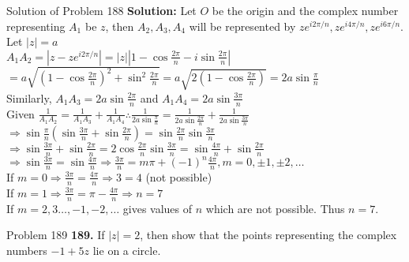 \documentclass[aspectratio=169,8pt]{beamer}
\begin{document}
\begin{frame}{Solution of Problem 188}
  \textbf{Solution:} Let $O$ be the origin and the complex number representing $A_1$ be $z$, then $A_2, A_3, A_4$ will be
  represented by $ze^{i2\pi/n}, ze^{i4\pi/n}, ze^{i6\pi/n}$. Let $|z| = a$\\
  \vspace*{0.2cm}
  $A_1A_2 = \left|z - ze^{i2\pi/n}\right| = |z|\left|1 - \cos\frac{2\pi}{n} - i\sin\frac{2\pi}{n}\right|$\\
  \vspace*{0.2cm}
  $= a\sqrt{\left(1 - \cos\frac{2\pi}{n}\right)^2 + \sin^2\frac{2\pi}{n}} = a\sqrt{2\left(1 - \cos\frac{2\pi}{n}\right)} =
  2a\sin\frac{\pi}{n}$\\
  \vspace*{0.2cm}
  Similarly, $A_1A_3 = 2a\sin\frac{2\pi}{n}$ and $A_1A_4 = 2a\sin\frac{3\pi}{n}$\\
  \vspace*{0.2cm}
  Given $\frac{1}{A_1A_2} = \frac{1}{A_1A_3} + \frac{1}{A_1A_4}\therefore \frac{1}{2a\sin\frac{\pi}{n}} =
  \frac{1}{2a\sin\frac{2\pi}{n}} + \frac{1}{2a\sin\frac{3\pi}{n}}$\\
  \vspace*{0.2cm}
  $\Rightarrow \sin\frac{\pi}{n}\left(\sin\frac{3\pi}{n} + \sin\frac{2\pi}{n}\right) = \sin\frac{2\pi}{n}\sin\frac{3\pi}{n}$\\
  \vspace*{0.2cm}
  $\Rightarrow \sin\frac{3\pi}{n} + \sin\frac{2\pi}{n} = 2\cos\frac{2\pi}{n}\sin\frac{3\pi}{n} = \sin\frac{4\pi}{n} +
  \sin\frac{2\pi}{n}$\\
  \vspace*{0.2cm}
  $\Rightarrow \sin\frac{3\pi}{n} = \sin\frac{4\pi}{n}\Rightarrow \frac{3\pi}{n} = m\pi + (-1)^n\frac{4\pi}{n}, m = 0,\pm1,
  \pm2,\ldots$\\
  \vspace*{0.2cm}
  If $m = 0\Rightarrow \frac{3\pi}{n} = \frac{4\pi}{n} \Rightarrow 3 = 4$ (not possible)\\
  \vspace*{0.2cm}
  If $m = 1\Rightarrow \frac{3\pi}{n} = \pi - \frac{4\pi}{n}\Rightarrow n = 7$\\
  \vspace*{0.2cm}
  If $m = 2,3 \ldots, -1, -2,\ldots$ gives values of $n$ which are not possible. Thus $n = 7$.
\end{frame}
\begin{frame}{Problem 189}
  \textbf{189.} If $|z| = 2$, then show that the points representing the complex numbers $-1 + 5z$ lie on a circle.
\end{frame}
\end{document}
